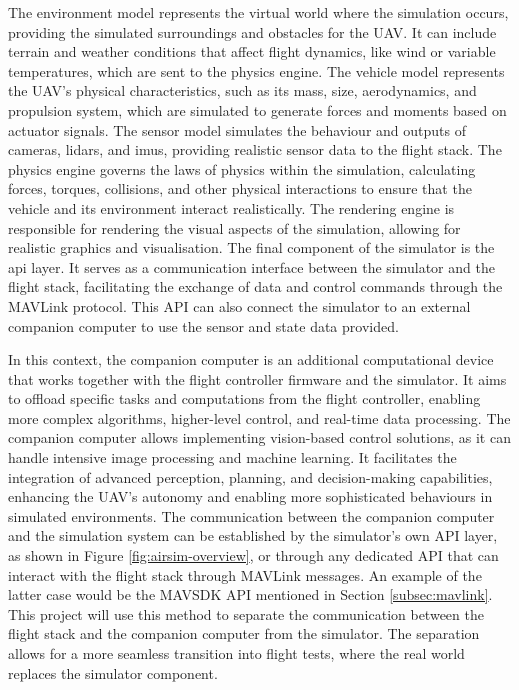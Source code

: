 The environment model represents the virtual world where the simulation occurs, providing the simulated surroundings and obstacles for the UAV. It can include terrain and weather conditions that affect flight dynamics, like wind or variable temperatures, which are sent to the physics engine. 
The vehicle model represents the UAV's physical characteristics, such as its mass, size, aerodynamics, and propulsion system, which are simulated to generate forces and moments based on actuator signals.
The sensor model simulates the behaviour and outputs of cameras, lidars, and \acrshort{imu}s, providing realistic sensor data to the flight stack.
The physics engine governs the laws of physics within the simulation, calculating forces, torques, collisions, and other physical interactions to ensure that the vehicle and its environment interact realistically.
The rendering engine is responsible for rendering the visual aspects of the simulation, allowing for realistic graphics and visualisation.
The final component of the simulator is the \acrshort{api} layer. It serves as a communication interface between the simulator and the flight stack, facilitating the exchange of data and control commands through the MAVLink protocol. This API can also connect the simulator to an external companion computer to use the sensor and state data provided. 

In this context, the companion computer is an additional computational device that works together with the flight controller firmware and the simulator. It aims to offload specific tasks and computations from the flight controller, enabling more complex algorithms, higher-level control, and real-time data processing. The companion computer allows implementing vision-based control solutions, as it can handle intensive image processing and machine learning. It facilitates the integration of advanced perception, planning, and decision-making capabilities, enhancing the UAV's autonomy and enabling more sophisticated behaviours in simulated environments.
The communication between the companion computer and the simulation system can be established by the simulator’s own API layer, as shown in Figure \ref{fig:airsim-overview}, or through any dedicated API that can interact with the flight stack through MAVLink messages.
An example of the latter case would be the MAVSDK API mentioned in Section \ref{subsec:mavlink}.
This project will use this method to separate the communication between the flight stack and the companion computer from the simulator.
The separation allows for a more seamless transition into flight tests, where the real world replaces the simulator component.

